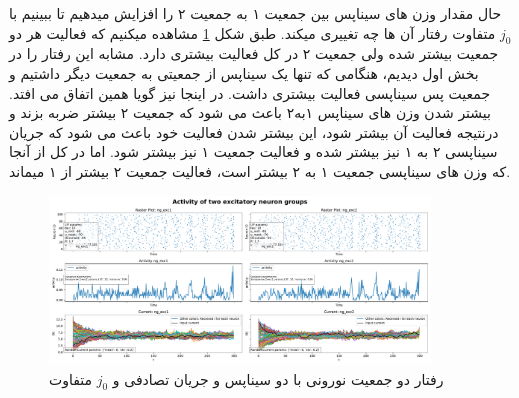 \documentclass{report}
\begin{document}
            حال مقدار وزن های سیناپس بین جمعیت ۱ به جمعیت ۲ را افزایش میدهیم تا ببینیم با 
            $j_0$
            متفاوت رفتار آن ها چه تغییری میکند. طبق شکل 
            \ref{fig:part2-two-ng-full-synapse-diff-j-rand-curr}
            مشاهده میکنیم که فعالیت هر دو جمعیت بیشتر شده ولی جمعیت ۲ در کل فعالیت بیشتری دارد. مشابه این رفتار را در بخش اول دیدیم، هنگامی که تنها یک سیناپس از جمعیتی به جمعیت دیگر داشتیم و جمعیت پس سیناپسی فعالیت بیشتری داشت. در اینجا نیز گویا همین اتفاق می افتد. بیشتر شدن وزن های سیناپس ۱به۲ باعث می شود که جمعیت ۲ بیشتر ضربه بزند و درنتیجه فعالیت آن بیشتر شود، این بیشتر شدن فعالیت خود باعث می شود که جریان سیناپسی 
            ۲ به ۱
            نیز بیشتر شده و فعالیت جمعیت ۱ نیز بیشتر شود. اما در کل از آنجا که وزن های سیناپسی جمعیت ۱ به ۲ بیشتر است، فعالیت جمعیت ۲ بیشتر از ۱ میماند.
            \begin{figure}[!ht]
                \centering
                \includegraphics[width=0.9\textwidth]{plots/part2-two-ng-full-synapse-diff-j-rand-curr.pdf} 
                \caption{رفتار دو جمعیت نورونی با دو سیناپس و جریان تصادفی و $j_0$ متفاوت}
                \label{fig:part2-two-ng-full-synapse-diff-j-rand-curr}
            \end{figure}
\end{document}

